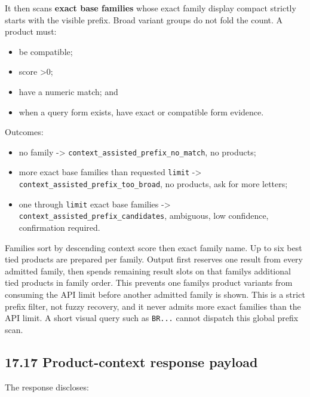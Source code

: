 It then scans \textbf{exact base families} whose exact family display compact strictly starts with the visible prefix. Broad variant groups do not fold the count. A product must:

\begin{itemize}
\tightlist
\item
  be compatible;
\item
  score \textgreater0;
\item
  have a numeric match; and
\item
  when a query form exists, have exact or compatible form evidence.
\end{itemize}

Outcomes:

\begin{itemize}
\tightlist
\item
  no family -\textgreater{} \texttt{context\_\allowbreak{}assisted\_\allowbreak{}prefix\_\allowbreak{}no\_\allowbreak{}match}, no products;
\item
  more exact base families than requested \texttt{limit} -\textgreater{} \texttt{context\_\allowbreak{}assisted\_\allowbreak{}prefix\_\allowbreak{}too\_\allowbreak{}broad}, no products, ask for more letters;
\item
  one through \texttt{limit} exact base families -\textgreater{} \texttt{context\_\allowbreak{}assisted\_\allowbreak{}prefix\_\allowbreak{}candidates}, ambiguous, low confidence, confirmation required.
\end{itemize}

Families sort by descending context score then exact family name. Up to six best tied products are prepared per family. Output first reserves one result from every admitted family, then spends remaining result slots on that family\textquotesingle s additional tied products in family order. This prevents one family\textquotesingle s product variants from consuming the API limit before another admitted family is shown. This is a strict prefix filter, not fuzzy recovery, and it never admits more exact families than the API limit. A short visual query such as \texttt{BR...} cannot dispatch this global prefix scan.

\subsection{17.17 Product-context response payload}\label{1717-product-context-response-payload}

The response discloses:

